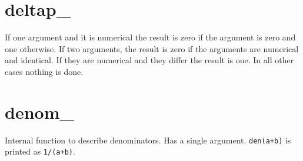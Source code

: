 
\section{deltap\_}
\label{fundeltap}
\noindent If one argument and it is numerical the result is zero if 
the argument is zero and one otherwise. If two arguments, the result is 
zero if the arguments are numerical and identical. If they are numerical and 
they differ the result is one. In all other cases nothing is done.


\section{denom\_}
\label{fundenom}
\noindent Internal function to describe denominators. Has a single 
argument. \verb:den(a+b): is printed as \verb:1/(a+b):.

%
%

